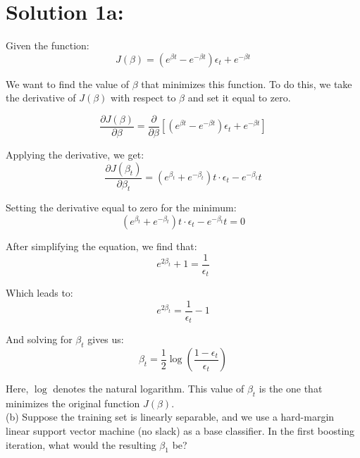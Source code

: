 \documentclass[10pt]{article}
\begin{document}
\section*{Solution 1a:}

Given the function:
\begin{equation}
J(\beta) = (e^{\beta t} - e^{-\beta t})\epsilon_t + e^{-\beta t}
\end{equation}

We want to find the value of $\beta$ that minimizes this function. To do this, we take the derivative of $J(\beta)$ with respect to $\beta$ and set it equal to zero.

\begin{equation}
\frac{\partial J(\beta)}{\partial \beta} = \frac{\partial}{\partial \beta} \left[ (e^{\beta t} - e^{-\beta t})\epsilon_t + e^{-\beta t} \right]
\end{equation}

Applying the derivative, we get:
\begin{equation}
\frac{\partial J(\beta_t)}{\partial \beta_t} = (e^{\beta_t} + e^{-\beta_t})t \cdot \epsilon_t - e^{-\beta_t}t
\end{equation}

Setting the derivative equal to zero for the minimum:
\begin{equation}
(e^{\beta_t} + e^{-\beta_t})t \cdot \epsilon_t - e^{-\beta_t}t = 0
\end{equation}

After simplifying the equation, we find that:
\begin{equation}
e^{2\beta_t} + 1 = \frac{1}{\epsilon_t}
\end{equation}

Which leads to:
\begin{equation}
e^{2\beta_t} = \frac{1}{\epsilon_t} - 1
\end{equation}

And solving for $\beta_t$ gives us:
\begin{equation}
\beta_t = \frac{1}{2} \log\left(\frac{1 - \epsilon_t}{\epsilon_t}\right)
\end{equation}

Here, $\log$ denotes the natural logarithm. This value of $\beta_t$ is the one that minimizes the original function $J(\beta)$. \\

(b) Suppose the training set is linearly separable, and we use a hard-margin linear support vector machine (no slack) as a base classifier. In the first boosting iteration, what would the resulting $\beta_{1}$ be?
\end{document}
